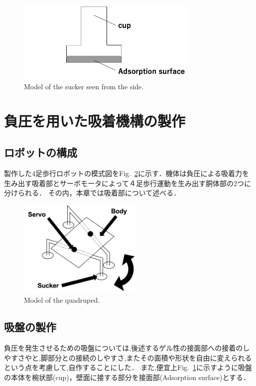 \documentclass[uplatex,dvipdfmx]{jlreq}
\begin{document}
\begin{figure}[t]
    \centering
    \includegraphics[height=40mm,]{./figure/sideview_sucker.png}
    \caption{Model of the sucker seen from the side.}
    \label{fig:model_sucker}
\end{figure}

\section{負圧を用いた吸着機構の製作}
\subsection{ロボットの構成}
製作した4足歩行ロボットの模式図をFig.~\ref{fig:model_of_the_quadruped}に示す．機体は負圧による吸着力を生み出す吸着部とサーボモータによって４足歩行運動を生み出す胴体部の2つに分けられる．
その内，本章では吸着部について述べる．

\begin{figure}
    \centering
    \includegraphics[width=60mm]{./figure/overview_model.png}
    \caption{Model of the quadruped.}
    \label{fig:model_of_the_quadruped}
\end{figure}

\subsection{吸盤の製作}
負圧を発生させるための吸盤については,後述するゲル性の接面部への接着のしやすさやと,脚部分との接続のしやすさ,またその面積や形状を自由に変えられるという点を考慮して,自作することにした．
また,便宜上Fig.~\ref{fig:model_sucker}に示すように吸盤の本体を椀状部(cup)，壁面に接する部分を接面部(Adsorption surface)とする．
\end{document}
